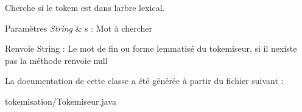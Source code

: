 Cherche si le tokem est dans l\textquotesingle{}arbre lexical. 


\begin{DoxyParams}{Paramètres}
{\em String} & s \+: Mot à chercher \\
\hline
\end{DoxyParams}
\begin{DoxyReturn}{Renvoie}
String \+: Le mot de fin ou forme lemmatisé du tokemiseur, si il n\textquotesingle{}existe pas la méthode renvoie null 
\end{DoxyReturn}


La documentation de cette classe a été générée à partir du fichier suivant \+:\begin{DoxyCompactItemize}
\item 
tokemisation/Tokemiseur.\+java\end{DoxyCompactItemize}
